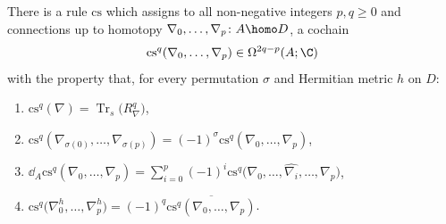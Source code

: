 \begin{lemma*} There is a rule $\mathrm{cs}$ which assigns to all non-negative integers $p,q\geqslant 0$ and connections up to homotopy $\nabla_0,\dots ,\nabla_p\colon A \homo D$, a cochain
\begin{gather*}
 \mathrm{cs}^q(\nabla_0,\dots ,\nabla_p) \in \Omega^{2q-p}(A;\C)
\end{gather*}with the property that, for every permutation $\sigma$ and Hermitian metric $h$ on $D$:{\samepage
\begin{enumerate}\itemsep=0pt
 \item[$\mathrm{CS} 1)$] $\mathrm{cs}^q(\nabla)=\operatorname{Tr}_s\big(R_{\nabla}^q\big)$,
 \item[$\mathrm{CS} 2)$] $\mathrm{cs}^q(\nabla_{\sigma(0)},\dots ,\nabla_{\sigma (p)})=(-1)^{\sigma}\mathrm{cs}^q(\nabla_0,\dots ,\nabla_p)$,
 \item[$\mathrm{CS} 3)$] $\dd_A\mathrm{cs}^q(\nabla_0,\dots ,\nabla_p) = \sum\limits_{i=0}^p(-1)^i\mathrm{cs}^q\big(\nabla_0,\dots ,\widehat{\nabla_i},\dots ,\nabla_p\big)$,
 \item[$\mathrm{CS} 4)$] $\mathrm{cs}^q\big(\nabla_0^h,\dots ,\nabla_p^h\big) =(-1)^q\overline{\mathrm{cs}^q(\nabla_0,\dots ,\nabla_p)}$.
\end{enumerate}}
\end{lemma*}

